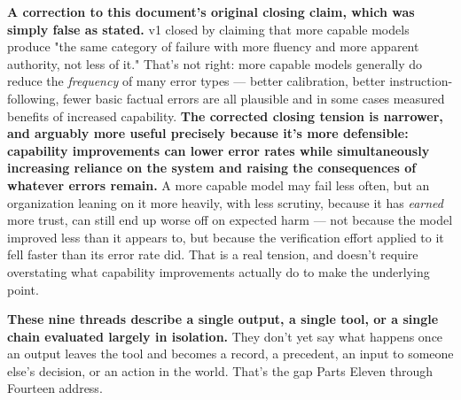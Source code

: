 \textbf{A correction to this document's original closing claim, which was simply false as stated.} v1 closed by claiming that more capable models produce "the same category of failure with more fluency and more apparent authority, not less of it." That's not right: more capable models generally do reduce the \emph{frequency} of many error types --- better calibration, better instruction-following, fewer basic factual errors are all plausible and in some cases measured benefits of increased capability. \textbf{The corrected closing tension is narrower, and arguably more useful precisely because it's more defensible: capability improvements can lower error rates while simultaneously increasing reliance on the system and raising the consequences of whatever errors remain.} A more capable model may fail less often, but an organization leaning on it more heavily, with less scrutiny, because it has \emph{earned} more trust, can still end up worse off on expected harm --- not because the model improved less than it appears to, but because the verification effort applied to it fell faster than its error rate did. That is a real tension, and doesn't require overstating what capability improvements actually do to make the underlying point.

\textbf{These nine threads describe a single output, a single tool, or a single chain evaluated largely in isolation.} They don't yet say what happens once an output leaves the tool and becomes a record, a precedent, an input to someone else's decision, or an action in the world. That's the gap Parts Eleven through Fourteen address.

